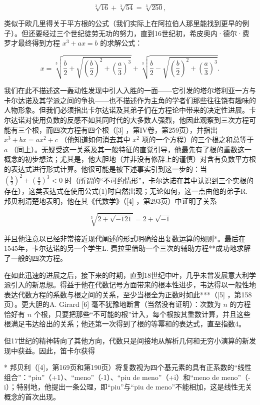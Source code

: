 \[
\sqrt [ 3 ]{1 6} + \sqrt [ 3 ]{5 4} = \sqrt [ 3 ]{2 5 0},
\]

类似于欧几里得关于平方根的公式（我们实际上在阿拉伯人那里能找到更早的例子）。但还要经过三个世纪徒劳无功的努力，直到16世纪初，希皮奥内·德尔·费罗才最终得到方程 \(x^3 + ax = b\) 的求解公式：

\[
x = \sqrt [ 3 ]{\frac {b}{2} + \sqrt {\left(\frac {b}{2}\right) ^ {2} + \left(\frac {a}{3}\right) ^ {3}}} + \sqrt [ 3 ]{\frac {b}{2} - \sqrt {\left(\frac {b}{2}\right) ^ {2} + \left(\frac {a}{3}\right) ^ {3}}}.\tag{1}
\]

我们在此不描述这一轰动性发现中引人入胜的一面——它引发的塔尔塔利亚一方与卡尔达诺及其学派之间的争执——也不描述作为主角的学者们那些往往饶有趣味的人物形象。但我们必须指出卡尔达诺及其弟子们在方程论中带来的决定性进展。卡尔达诺对使用负数的反感不如其同时代的大多数人强烈，他因此观察到三次方程可能有三个根，而四次方程有四个根（{[}3{]} ，第IV卷，第259页），并指出 \(x^3 + bx = ax^2 + c\) （他知道如何消去其中 \(x^2\) 项的一个方程）的三个根之和总等于 \(a\) （同上）。无疑受这一关系及其一般特征的直觉引导，他最先有了根的重数这一概念的初步想法；尤其是，他大胆地（并非没有修辞上的谨慎）对含有负数平方根的表达式进行形式计算。他很可能是被下述事实引到这一步的：当 \(\left(\frac{b}{2}\right)^{2} + \left(\frac{a}{3}\right)^{3} < 0\) 时（所谓的“不可约情形”，卡尔达诺在其中认识到三个实根的存在），这类表达式在使用公式(1)时自然出现；无论如何，这一点由他的弟子R. 邦贝利清楚地表明，他在其《代数学》（{[}4{]} ，第293页）中证明了关系

\[
\sqrt [ 3 ]{2 + \sqrt {- 1 2 1}} = 2 + \sqrt {- 1}
\]

并且他注意以已经非常接近现代阐述的形式明确给出复数运算的规则*。最后在1545年，卡尔达诺的另一个学生L. 费拉里借助一个三次的辅助方程**成功地求解了一般的四次方程。

在如此迅速的进展之后，接下来的时期，直到18世纪中叶，几乎未曾发展意大利学派引入的新思想。得益于他在代数记号方面带来的根本性进步，韦达得以一般性地表达代数方程的系数与根之间的关系，至少当根全为正数时如此***（{[}5{]} ，第158页）。更大胆的A. Girard {[}6{]} 毫不犹豫地断言（当然没有证明）：次数为 \(n\) 的方程恰好有 \(n\) 个根，只要把那些“不可能的根”计入，每个根按其重数计算，并且这些根满足韦达给出的关系；他还第一次得到了根的等幂和的表达式，直至指数4。

但17世纪的精神转向了其他方向，代数只是间接地从解析几何和无穷小演算的新发现中获益。因此，笛卡尔获得

* 邦贝利（{[}4{]}，第169页和第190页）将复数视为四个基元素的具有正系数的“线性组合”：“piu”（+1）、“meno”（-1）、“piu de meno”（+i）和“meno de meno”（-i）；特别地，他提出一条公理，即“piu”与“piu de meno”不能相加，这是线性无关概念的首次出现。

